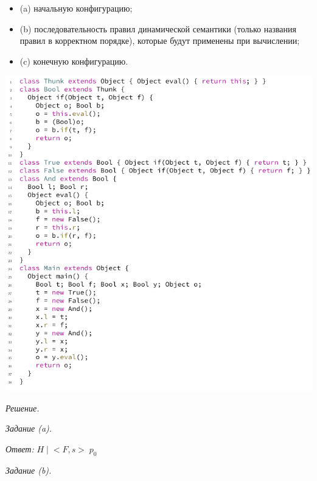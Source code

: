 \documentclass[landscape, 11pt]{report}
\begin{document}
	\begin{itemize}
		\item[] (a) начальную конфигурацию;
		\item[] (b) последовательность правил динамической семантики (только названия правил в корректном порядке), которые будут применены при вычислении;
		\item[] (c) конечную конфигурацию.
	\end{itemize}
	
	\begin{center}
		\includegraphics[scale=0.505]{code}
	\end{center}
	
	\newpage
	
	\textit{Решение.}
	
	\vspace{0.5cm}
	
	\textit{Задание (a).}
	
	\vspace{0.1cm}
	
	\textit{Ответ:} $H \; | \; <F, s> \; p_0$
	
	\vspace{0.5cm}
	
	\textit{Задание (b).}
	
	\vspace{0.1cm}
	
\end{document}
